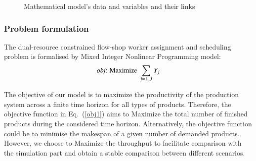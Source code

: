 \documentclass[review,12pt, 3p, times]{elsarticle}
\begin{document}
\begin{figure}[htbp]
	\centering
	\caption{Mathematical model's data and variables and their links}
			    
			
	\label{fig:ModelVariablesLinks2}
\end{figure}
					
					              
\subsubsection{Problem formulation}
					
			
					
The dual-resource constrained flow-shop worker assignment and scheduling problem is formalised by Mixed Integer Nonlinear Programming  model:
\begin{equation}
	\text{{\it obj}: Maximize } \sum_{j=1..J}Y_j\label{obj1}
\end{equation} 
			
The objective of our model is to maximize the productivity of the production system across a finite time horizon for all types of products. Therefore, the objective function in Eq.~(\ref{obj1}) aims to Maximize the total number of finished products during the considered time horizon. Alternatively, the objective function could be to minimise the makespan of a given number of demanded products. However, we choose to Maximize the throughput to facilitate comparison with the simulation part and obtain a stable comparison between different scenarios.
	
\end{document}
